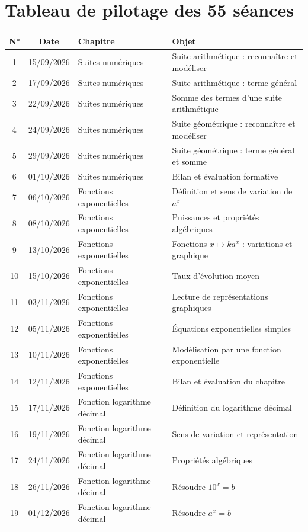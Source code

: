 \chapter{Tableau de pilotage des 55 séances}
\small
\begin{longtable}{cclp{}}
\toprule
N° & Date & Chapitre & Objet\\
\midrule\endhead
1 & 15/09/2026 & Suites numériques & Suite arithmétique : reconnaître et modéliser\\
2 & 17/09/2026 & Suites numériques & Suite arithmétique : terme général\\
3 & 22/09/2026 & Suites numériques & Somme des termes d'une suite arithmétique\\
4 & 24/09/2026 & Suites numériques & Suite géométrique : reconnaître et modéliser\\
5 & 29/09/2026 & Suites numériques & Suite géométrique : terme général et somme\\
6 & 01/10/2026 & Suites numériques & Bilan et évaluation formative\\
7 & 06/10/2026 & Fonctions exponentielles & Définition et sens de variation de $a^x$\\
8 & 08/10/2026 & Fonctions exponentielles & Puissances et propriétés algébriques\\
9 & 13/10/2026 & Fonctions exponentielles & Fonctions $x\mapsto k a^x$ : variations et graphique\\
10 & 15/10/2026 & Fonctions exponentielles & Taux d'évolution moyen\\
11 & 03/11/2026 & Fonctions exponentielles & Lecture de représentations graphiques\\
12 & 05/11/2026 & Fonctions exponentielles & Équations exponentielles simples\\
13 & 10/11/2026 & Fonctions exponentielles & Modélisation par une fonction exponentielle\\
14 & 12/11/2026 & Fonctions exponentielles & Bilan et évaluation du chapitre\\
15 & 17/11/2026 & Fonction logarithme décimal & Définition du logarithme décimal\\
16 & 19/11/2026 & Fonction logarithme décimal & Sens de variation et représentation\\
17 & 24/11/2026 & Fonction logarithme décimal & Propriétés algébriques\\
18 & 26/11/2026 & Fonction logarithme décimal & Résoudre $10^x=b$\\
19 & 01/12/2026 & Fonction logarithme décimal & Résoudre $a^x=b$\\

\end{longtable}
